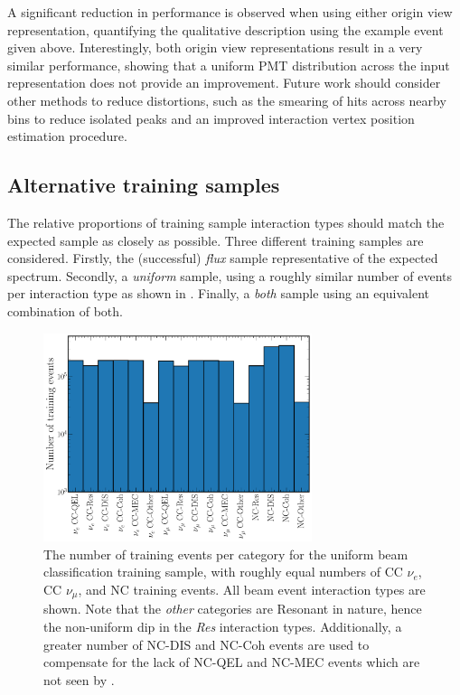 A significant reduction in performance is observed when using either origin view representation,
quantifying the qualitative description using the example event given above. Interestingly, both
origin view representations result in a very similar performance, showing that a uniform PMT
distribution across the input representation does not provide an improvement. Future work should
consider other methods to reduce distortions, such as the smearing of hits across nearby bins to
reduce isolated peaks and an improved interaction vertex position estimation procedure.

\subsection{Alternative training samples} %
\label{sec:results_samples} %

The relative proportions of training sample interaction types should match the expected sample as
closely as possible. Three different training samples are considered. Firstly, the (successful)
\emph{flux} sample representative of the expected spectrum. Secondly, a \emph{uniform} sample,
using a roughly similar number of events per interaction type as shown in
. Finally, a \emph{both} sample using an equivalent
combination of both.

\begin{figure} %
    \includegraphics[width=0.7\textwidth]{diagrams/7-results/explore_uniform_training_sample.pdf}
    \caption[Number of training events per category for the uniform beam classification network
        training sample] {The number of training events per category for the uniform beam
        classification training sample, with roughly equal numbers of CC $\nu_{e}$, CC
        $\nu_{\mu}$, and NC training events. All beam event interaction types are shown. Note that
        the \emph{other} categories are Resonant in nature, hence the non-uniform dip in the
        \emph{Res} interaction types. Additionally, a greater number of NC-DIS and NC-Coh events
        are used to compensate for the lack of NC-QEL and NC-MEC events which are not seen by
        \chipsfive.}
    \label{fig:explore_uniform_training_sample}
\end{figure}

